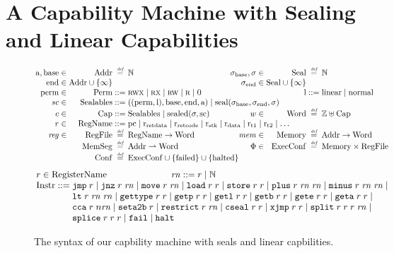 \documentclass[acmsmall,review,anonymous]{acmart}\settopmatter{printfolios=true,printccs=false,printacmref=false}
\renewcommand{\MemSeg}{\shareddom{MemSeg}}
\renewcommand{\Reg}{\shareddom{RegFile}}
\renewcommand{\RegName}{\shareddom{RegName}}
\renewcommand{\SealableCaps}{\shareddom{Sealables}}
\begin{document}
\section{A Capability Machine with Sealing and Linear Capabilities}
\label{sec:cap-mach-w-seal-and-lin}
\begin{figure}[tb]
  \centering
  \[
  \arraycolsep=1.4pt
  \begin{array}{rrcl l rrcl}
   \addrbnf,\basebnf \in & \Addr & \defeq & \nats & \phantom{mak} & \sealbasebnf, \sigma \in & \Seal & \defeq & \nats\\
    \aendbnf \in & \Addr \cup \{\infty \} & & & & \sealendbnf \in & \Seal \cup \{\infty \}& &\\
    \permbnf \in& \Perm & \defbnf & \rwx \mid \rx \mid \rw \mid \ro \mid \noperm & & &\linbnf & \defbnf & \linear \mid \normal\\
    \vsc \in &\SealableCaps&\defbnf & \multicolumn{6}{l}{((\permbnf,\linbnf),\basebnf,\aendbnf,\addrbnf) \mid \seal{\sealbasebnf,\sealendbnf,\sigma}}\\
    c \in&\Caps& \defbnf &  \SealableCaps \mid \sealed{\sigma,\scbnf} & & w \in &\Word & \defeq & \ints \uplus \Caps\\ 
    r \in& \RegName & \defbnf & \multicolumn{6}{l}{\pcreg \mid \rretd \mid \rretc \mid \rstk \mid \rdata \mid \rtmp{1} \mid \rtmp{2} \mid \dots} \\
    \reg \in &\Reg & \defeq & \RegName \fun \Word & & \mem \in&\Mem & \defeq & \Addr \fun \Word\\
    &\MemSeg & \defeq & \Addr \parfun \Word & & \Phi \in & \ExecConf & \defeq & \Mem \times \Reg\\
    &\Conf & \defeq & \multicolumn{6}{l}{\ExecConf \cup \{\failed\} \cup \{\halted\} }
  \end{array}
\]
\[
  \arraycolsep=1.4pt
\begin{array}{rcl}
\multicolumn{3}{l}{    \arraycolsep=0pt
      \com{r} \in  \tRegName \hspace{2.5cm}   \com{\rn} \defbnf \com{r} \mid \nats
}\\
  \Instr &\defbnf & \tjmp{\com{r}} \mid \tjnz{\com{r}}{\com{\rn}} \mid \tmove{\com{r}}{\com{\rn}} \mid \tload{\com{r}}{\com{r}} \mid \tstore{\com{r}}{\com{r}} \mid \tplus{\com{r}}{\com{\rn}}{\com{\rn}} \mid \tminus{\com{r}}{\com{\rn}}{\com{\rn}} \mid\\
         & & \tlt{\com{r}}{\com{\rn}}{\com{\rn}} \mid \tisptr{\com{r}}{\com{r}} \mid\tgetp{\com{r}}{\com{r}} \mid \tgetlin{\com{r}}{\com{r}} \mid \tgetb{\com{r}}{\com{r}} \mid \tgete{\com{r}}{\com{r}} \mid \tgeta{\com{r}}{\com{r}}  \mid \\
  & & \tcca{\com{r}}{\com{n\rn}} \mid \tsetatob{\com{r}} \mid \trestrict{\com{r}}{\com{\rn}} \mid \tcseal{\com{r}}{\com{r}} \mid \txjmp{\com{r}}{\com{r}} \mid  \tsplit{\com{r}}{\com{r}}{\com{r}}{\com{\rn}} \mid\\ 
      & & \tsplice{\com{r}}{\com{r}}{\com{r}} \mid \tfail \mid \thalt 
\end{array}
\]
  \caption{The syntax of our capbility machine with seals and linear capbilities.}
  \label{fig:target-syntax}
\end{figure}
\end{document}
